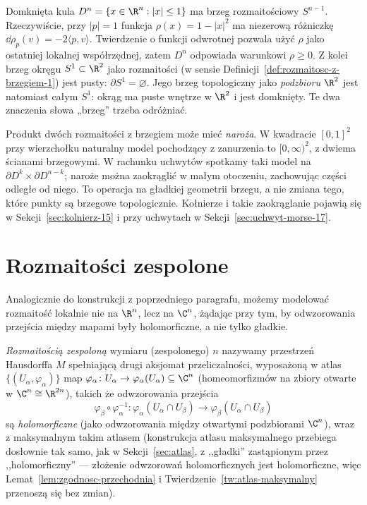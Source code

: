 \begin{przyklad}
\label{prz:brzeg-kula-okrag-1}
Domknięta kula $D^n=\{x\in\R^n:|x|\leq1\}$ ma brzeg
rozmaitościowy $S^{n-1}$. Rzeczywiście, przy $|p|=1$
funkcja $\rho(x)=1-|x|^2$ ma niezerową różniczkę
$\dd\rho_p(v)=-2\langle p,v\rangle$. Twierdzenie o funkcji
odwrotnej pozwala użyć $\rho$ jako ostatniej lokalnej
współrzędnej, zatem $D^n$ odpowiada warunkowi $\rho\geq0$.
Z kolei brzeg okręgu $S^1\subset\R^2$ jako rozmaitości
(w sensie Definicji~\ref{def:rozmaitosc-z-brzegiem-1})
jest pusty: $\partial S^1=\varnothing$. Jego brzeg topologiczny
jako \emph{podzbioru $\R^2$} jest natomiast całym $S^1$: okrąg ma
puste wnętrze w $\R^2$ i jest domknięty.
Te dwa znaczenia słowa „brzeg” trzeba odróżniać.
\end{przyklad}

Produkt dwóch rozmaitości z brzegiem może mieć
\emph{naroża}. W kwadracie $[0,1]^2$ przy wierzchołku
naturalny model pochodzący z zanurzenia to
$[0,\infty)^2$, z dwiema ścianami brzegowymi.
W rachunku uchwytów spotkamy taki model na
$\partial D^k\times\partial D^{n-k}$; naroże można
zaokrąglić w małym otoczeniu, zachowując części
odległe od niego. To operacja na gładkiej geometrii
brzegu, a nie zmiana tego, które punkty są brzegowe
topologicznie. Kołnierze i takie zaokrąglanie pojawią się
w Sekcji~\ref{sec:kolnierz-15} i przy uchwytach w
Sekcji~\ref{sec:uchwyt-morse-17}.

\section{Rozmaitości zespolone}

Analogicznie do konstrukcji z poprzedniego paragrafu, możemy modelować rozmaitość lokalnie
nie na $\R^n$, lecz na $\C^n$, żądając przy tym, by odwzorowania przejścia między mapami
były holomorficzne, a nie tylko gładkie.

\begin{definicja}
\emph{Rozmaitością zespoloną} wymiaru (zespolonego) $n$ nazywamy przestrzeń Hausdorffa $M$
spełniającą drugi aksjomat przeliczalności, wyposażoną w atlas $\{(U_\alpha,\varphi_\alpha)\}$
map $\varphi_\alpha\colon U_\alpha\to\varphi_\alpha(U_\alpha)\subseteq\C^n$ (homeomorfizmów
na zbiory otwarte w $\C^n\cong\R^{2n}$), takich że odwzorowania przejścia
\[
\varphi_\beta\circ\varphi_\alpha^{-1}\colon\varphi_\alpha(U_\alpha\cap U_\beta)\to
\varphi_\beta(U_\alpha\cap U_\beta)
\]
są \emph{holomorficzne} (jako odwzorowania między otwartymi podzbiorami $\C^n$), wraz z
maksymalnym takim atlasem (konstrukcja atlasu maksymalnego przebiega dosłownie tak samo,
jak w Sekcji~\ref{sec:atlas}, z ,,gładki'' zastąpionym przez ,,holomorficzny'' — złożenie odwzorowań
holomorficznych jest holomorficzne, więc Lemat~\ref{lem:zgodnosc-przechodnia} i
Twierdzenie~\ref{tw:atlas-maksymalny} przenoszą się bez zmian).
\end{definicja}

